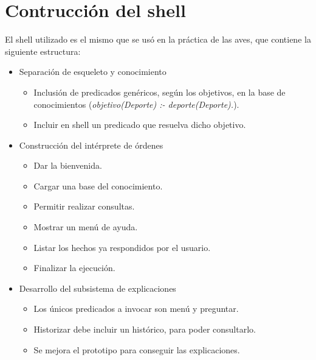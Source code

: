 \chapter{Contrucción del shell}

El shell utilizado es el mismo que se usó en la práctica de las aves, que contiene la siguiente estructura:

\begin{itemize}
\item Separación de esqueleto y conocimiento
	\begin{itemize}
	\item Inclusión de predicados genéricos, según los objetivos, en la base de conocimientos (\emph{objetivo(Deporte) :- deporte(Deporte).}).
	\item Incluir en shell un predicado que resuelva dicho objetivo.
	\end{itemize}

\item Construcción del intérprete de órdenes
	\begin{itemize}
	\item Dar la bienvenida.
	\item Cargar una base del conocimiento.
	\item Permitir realizar consultas.
	\item Mostrar un menú de ayuda.
	\item Listar los hechos ya respondidos por el usuario.
	\item Finalizar la ejecución.
	\end{itemize}

\item Desarrollo del subsistema de explicaciones
	\begin{itemize}
	\item Los únicos predicados a invocar son menú y preguntar.
	\item Historizar debe incluir un histórico, para poder consultarlo.
	\item Se mejora el prototipo para conseguir las explicaciones.
	\end{itemize}
\end{itemize}


